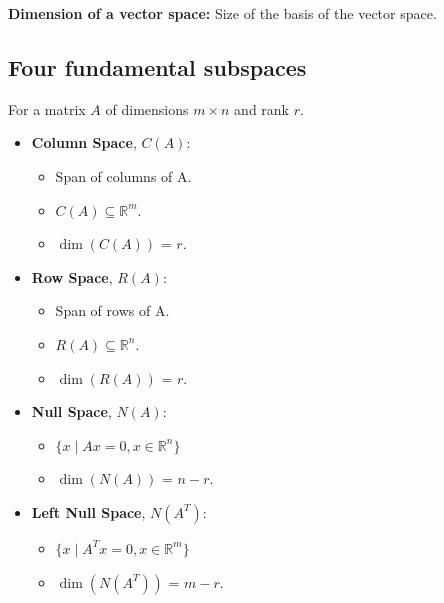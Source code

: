 \textbf{Dimension of a vector space:} Size of the basis of the vector space.

\subsection{Four fundamental subspaces}
For a matrix $A$ of dimensions $m \times n$ and rank $r$.
\begin{itemize}
	\item \textbf{Column Space}, $C(A)$: 
    \vspace{-0.75em}
    \begin{itemize}
    \setlength{\itemsep}{-0.5em}
        \item Span of columns of A.\\
        \item $C(A) \subseteq \mathbb{R}^m$.\\
        \item $\dim(C(A))$ = $r$.
    \end{itemize}

	\item \textbf{Row Space}, $R(A)$: 
    \begin{itemize}
    \vspace{-0.75em}
    \setlength{\itemsep}{-0.5em}
        \item Span of rows of A.\\
        \item $R(A) \subseteq \mathbb{R}^n.$\\ 
        \item $\dim(R(A))$ = $r$.
    \end{itemize}

	\item \textbf{Null Space}, $N(A)$: 
    \vspace{-0.75em}
    \begin{itemize}
    \setlength{\itemsep}{-0.5em}
        \item $\{x \mid Ax = 0, x \in \mathbb{R}^n\}$ 
        \item $\dim(N(A))$ = $n-r$.
    \end{itemize}

	\item \textbf{Left Null Space}, $N(A^T)$: 
    \vspace{-0.75em}
    \begin{itemize}
    \setlength{\itemsep}{-0.5em}
        \item $\{x \mid A^Tx = 0, x \in \mathbb{R}^m\}$ 
        \item $\dim(N(A^T))$ = $m-r$.
    \end{itemize}
\end{itemize}

